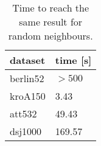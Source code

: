\begin{table}[!htb]
	\centering
	\begin{tabular}{|l|l|}
		\hline
		dataset  & time {[}s{]} \\ \hline
		berlin52 & $>500$            \\ \hline
		kroA150  & 3.43         \\ \hline
		att532   & 49.43        \\ \hline
		dsj1000  & 169.57       \\ \hline
	\end{tabular}
	\caption{Time to reach the same result for random neighbours.}
	\label{tab:time_to_reach}
\end{table}